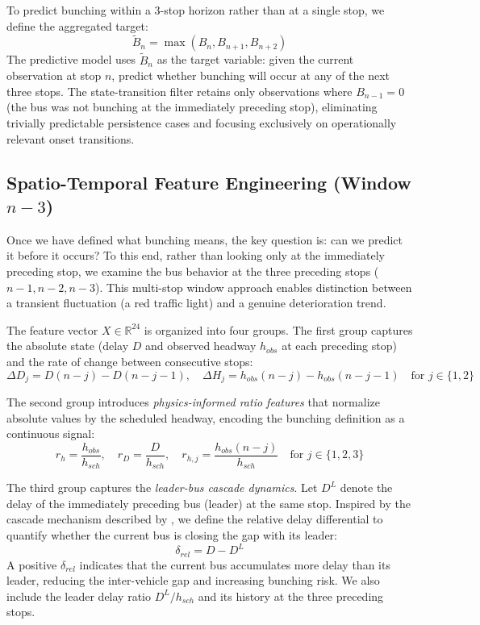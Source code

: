 \documentclass[fleqn,10pt,lineno]{wlpeerj}
\begin{document}
To predict bunching within a 3-stop horizon rather than at a single stop, we define the aggregated target:
\begin{equation}
  \tilde{B}_n = \max(B_n, B_{n+1}, B_{n+2})
\end{equation}
The predictive model uses $\tilde{B}_n$ as the target variable: given the current observation at stop $n$, predict whether bunching will occur at any of the next three stops. The state-transition filter retains only observations where $B_{n-1}=0$ (the bus was not bunching at the immediately preceding stop), eliminating trivially predictable persistence cases and focusing exclusively on operationally relevant onset transitions.

\subsection{Spatio-Temporal Feature Engineering (Window $n{-}3$)}

Once we have defined what bunching means, the key question is: can we predict it before it
occurs? To this end, rather than looking only at the immediately preceding stop, we examine the
bus behavior at the three preceding stops ($n{-}1, n{-}2, n{-}3$). This multi-stop window
approach enables distinction between a transient fluctuation (a red traffic light) and a genuine
deterioration trend.

The feature vector $X \in \mathbb{R}^{24}$ is organized into four groups. The first group captures the absolute state (delay $D$ and observed headway $h_{obs}$ at each preceding stop) and the rate of change between consecutive stops:
\begin{equation}
  \Delta D_j = D(n-j) - D(n-j-1), \quad \Delta H_j = h_{obs}(n-j) - h_{obs}(n-j-1) \quad \text{for } j \in \{1, 2\}
\end{equation}

The second group introduces \textit{physics-informed ratio features} that normalize absolute values by the scheduled headway, encoding the bunching definition as a continuous signal:
\begin{equation}
  r_h = \frac{h_{obs}}{h_{sch}}, \quad r_D = \frac{D}{h_{sch}}, \quad r_{h,j} = \frac{h_{obs}(n-j)}{h_{sch}} \quad \text{for } j \in \{1,2,3\}
\end{equation}

The third group captures the \textit{leader-bus cascade dynamics}. Let $D^{L}$ denote the delay of the immediately preceding bus (leader) at the same stop. Inspired by the cascade mechanism described by \citet{1}, we define the relative delay differential to quantify whether the current bus is closing the gap with its leader:
\begin{equation}
  \delta_{rel} = D - D^{L}
\end{equation}
A positive $\delta_{rel}$ indicates that the current bus accumulates more delay than its leader, reducing the inter-vehicle gap and increasing bunching risk. We also include the leader delay ratio $D^{L}/h_{sch}$ and its history at the three preceding stops.
\end{document}
